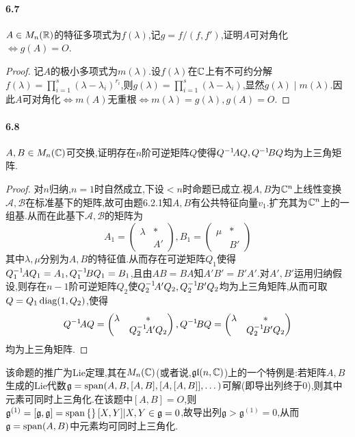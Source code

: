 \documentclass[11pt]{article}
\begin{document}
\paragraph{6.7}$A\in M_n(\mathbb{R})$的特征多项式为$f(\lambda)$,记$g=f/(f,f')$,证明$A$可对角化$\iff g(A)=O$.
\begin{proof}
    记$A$的极小多项式为$m(\lambda)$.设$f(\lambda)$在$\mathbb{C}$上有不可约分解$f(\lambda)=\prod_{i=1}^{s}(\lambda-\lambda_i)^{r_i}$,则$g(\lambda)=\prod_{i=1}^{s}(\lambda-\lambda_i)$,显然$g(\lambda)\mid m(\lambda)$.因此$A$可对角化$\iff m(A)$无重根$\iff m(\lambda)=g(\lambda), g(A)=O$.
\end{proof}
\paragraph{6.8}$A,B\in M_n(\mathbb{C})$可交换,证明存在$n$阶可逆矩阵$Q$使得$Q^{-1}\! AQ, Q^{-1}\! BQ$均为上三角矩阵.
\begin{proof}
    对$n$归纳,$n=1$时自然成立,下设$<n$时命题已成立.视$A,B$为$\mathbb{C}^n$上线性变换$\mathscr{A,B}$在标准基下的矩阵,故可由题6.2.1知$A,B$有公共特征向量$v_1$.扩充其为$\mathbb{C}^n$上的一组基.从而在此基下$\mathscr{A,B}$的矩阵为
    $$A_1=\begin{pmatrix}
        \lambda & *\\  & A'
    \end{pmatrix}, B_1=\begin{pmatrix}
        \mu & *\\  & B'
    \end{pmatrix}$$
    其中$\lambda,\mu$分别为$A,B$的特征值.从而存在可逆矩阵$Q_1$使得$Q_1^{-1}\! AQ_1=A_1, Q_1^{-1}\! BQ_1=B_1$,且由$AB=BA$知$A'B'=B'A'$.对$A',B'$运用归纳假设,则存在$n-1$阶可逆矩阵$Q_2$使$Q_2^{-1}\! A'Q_2, Q_2^{-1}\! B'Q_2$均为上三角矩阵,从而可取$Q=Q_1 \operatorname{diag}(1,Q_2)$,使得
    $$Q^{-1}\! AQ=\begin{pmatrix}
        \lambda & * \\  & Q_2^{-1}\! A' Q_2
    \end{pmatrix}, Q^{-1}\! BQ=\begin{pmatrix}
        \lambda & * \\  & Q_2^{-1}\! B' Q_2
    \end{pmatrix}$$
    均为上三角矩阵.
\end{proof}
\begin{remark}
    该命题的推广为Lie定理,其在$M_n(\mathbb{C})$(或者说,$\mathfrak{gl}(n,\mathbb{C})$)上的一个特例是:若矩阵$A,B$生成的Lie代数$\mathfrak{g}=\mathrm{span}(A,B,[A,B],[A,[A,B]],\dots)$可解(即导出列终于0),则其中元素可同时上三角化.在该题中$[A,B]=O$,则$\mathfrak{g}^{(1)}=[\mathfrak{g},\mathfrak{g}]=\mathrm{span}\left\{\right\}{[X,Y]|X,Y\in \mathfrak{g}}=0$,故导出列$\mathfrak{g}>\mathfrak{g}^{(1)}=0$,从而$\mathfrak{g}=\mathrm{span}(A,B)$中元素均可同时上三角化.
\end{remark}
\end{document}
